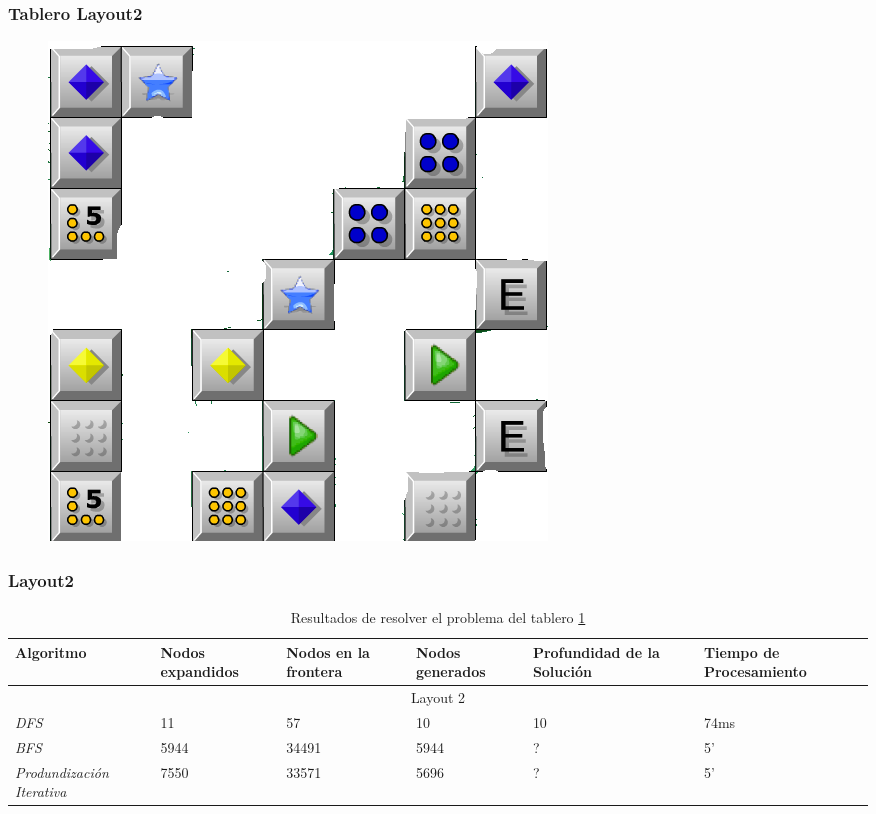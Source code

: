 \documentclass{beamer}
\begin{document}
\begin{frame}
\frametitle{Tablero Layout2}
\begin{figure}[hb]
	\includegraphics[scale=0.3]{../Boards/Layout3.png}
	 \label{fig:layout3}
\end{figure}
\end{frame}

\begin{frame}
\frametitle{Layout2}

\tiny{
\begin{table}[h]
\begin{center}
	\begin{tabular}{|p{1.3cm}|p{1cm}|p{1cm}|p{1cm}|p{2cm}|p{2cm}|}
	\hline
	 Algoritmo & Nodos expandidos & Nodos en la frontera & Nodos generados & Profundidad de la Soluci\'on & Tiempo de Procesamiento\\
	\hline \hline
		 \multicolumn{6}{|c|}{Layout 2} \\
	\hline
	\textit{DFS} & 11 & 57 & 10 & 10 & 74ms \\
	\textit{BFS} &5944 & 34491 & 5944 & ? & 5' \\
	\textit{Produndizaci\'on Iterativa} & 7550 & 33571 & 5696 & ? & 5' \\
	\hline
	\end{tabular}
\end{center}
\caption{Resultados de resolver el problema del tablero \ref{fig:layout3}}
\label{tab:costLayout3}
\end{table}}

\end{frame}
\end{document}
